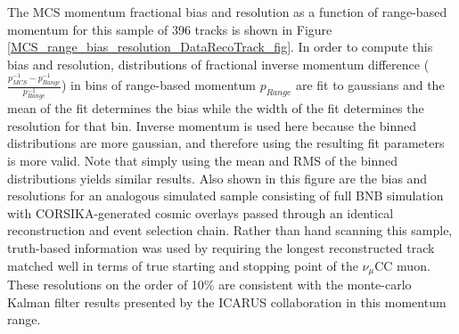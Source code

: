 \documentclass[a4paper,11pt]{article}
\begin{document}
The MCS momentum fractional bias and resolution as a function of range-based momentum for this sample of 396 tracks is shown in Figure \ref{MCS_range_bias_resolution_DataRecoTrack_fig}. In order to compute this bias and resolution, distributions of fractional inverse momentum difference ($\frac{p_{MCS}^{-1} - p_{Range}^{-1}}{p_{Range}^{-1}}$) in bins of range-based momentum $p_{Range}$ are fit to gaussians and the mean of the fit determines the bias while the width of the fit determines the resolution for that bin. Inverse momentum is used here because the binned distributions are more gaussian, and therefore using the resulting fit parameters is more valid. Note that simply using the mean and RMS of the binned distributions yields similar results. Also shown in this figure are the bias and resolutions for an analogous simulated sample consisting of full BNB simulation with CORSIKA-generated\cite{corsika_ref} cosmic overlays passed through an identical reconstruction and event selection chain. Rather than hand scanning this sample, truth-based information was used by requiring the longest reconstructed track matched well in terms of true starting and stopping point of the $\nu_\mu$CC muon. These resolutions on the order of 10\% are consistent with the monte-carlo Kalman filter results presented by the ICARUS collaboration in this momentum range\cite{icarus_mcs_paper}.\\
\end{document}
